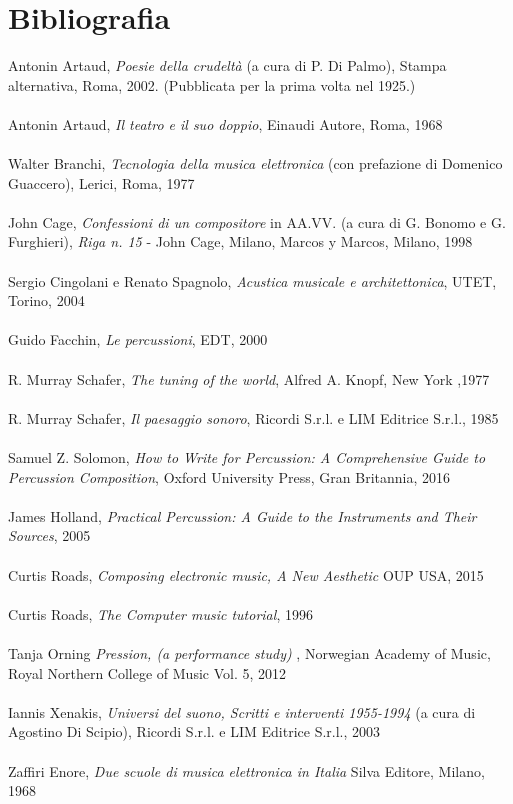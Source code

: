 
\chapter{Bibliografia}
\label{chp:Bibliografia}
Antonin Artaud, \textit{Poesie della crudeltà} (a cura di P. Di Palmo), Stampa alternativa, Roma, 2002. (Pubblicata per la prima volta nel 1925.) \\
\\
Antonin Artaud, \textit{Il teatro e il suo doppio}, Einaudi Autore, Roma, 1968 \\
\\
Walter Branchi, \textit{Tecnologia della musica elettronica} (con prefazione di Domenico Guaccero), Lerici, Roma, 1977 \\
\\
John Cage, \textit{Confessioni di un compositore} in AA.VV. (a cura di G. Bonomo e G. Furghieri), \textit{Riga n. 15} - John Cage, Milano, Marcos y Marcos, Milano, 1998\\ 
\\
Sergio Cingolani e Renato Spagnolo, \textit{Acustica musicale e architettonica}, UTET, Torino, 2004 \\
\\
Guido Facchin,  \textit{Le percussioni}, EDT, 2000 \\
\\
R. Murray Schafer, \textit{The tuning of the world}, Alfred A. Knopf, New York ,1977 \\
\\
R. Murray Schafer, \textit{Il paesaggio sonoro}, Ricordi S.r.l. e LIM Editrice S.r.l., 1985 \\
\\
Samuel Z. Solomon, \textit{How to Write for Percussion: A Comprehensive Guide to Percussion Composition}, Oxford University Press, Gran Britannia, 2016\\
 \\
James Holland, \textit{Practical Percussion: A Guide to the Instruments and Their Sources}, 2005 \\
\\
Curtis Roads, \textit{Composing electronic music, A New Aesthetic} OUP USA, 2015 \\
\\
Curtis Roads, \textit{The Computer music tutorial}, 1996 \\
\\
Tanja Orning \textit{Pression, (a performance study) }, Norwegian Academy of Music, Royal Northern College of Music Vol. 5, 2012 \\
\\
Iannis Xenakis, \textit{Universi del suono, Scritti e interventi 1955-1994} (a cura di Agostino Di Scipio), Ricordi S.r.l. e LIM Editrice S.r.l., 2003 \\
\\
Zaffiri Enore, \textit{Due scuole di musica elettronica in Italia} Silva Editore, Milano, 1968 